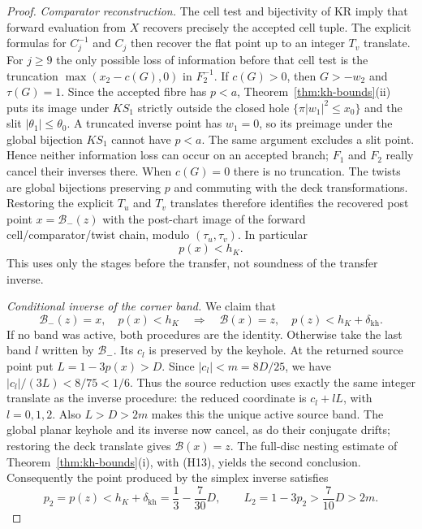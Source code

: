 \begin{proof}
\emph{Comparator reconstruction.} The cell test and bijectivity of $\mathrm{KR}$ imply that forward evaluation
from $X$ recovers precisely the accepted cell tuple. The explicit formulas for $C_j^{-1}$ and $C_j$ then recover
the flat point up to an integer $T_v$ translate. For $j\ge9$ the only possible loss of information before that
cell test is the truncation $\max(x_2-c(G),0)$ in $F_2^{-1}$. If $c(G)>0$, then $G>-w_2$ and $\tau(G)=1$.
Since the accepted fibre has $p<a$, Theorem~\ref{thm:kh-bounds}(ii) puts its image under $KS_1$ strictly outside
the closed hole $\{\pi|w_1|^2\le x_0\}$ and the slit $|\theta_1|\le\theta_0$.
A truncated inverse point has $w_1=0$, so its preimage under the global bijection $KS_1$ cannot have $p<a$.
The same argument excludes a slit point. Hence neither information loss can occur on an accepted branch;
$F_1$ and $F_2$ really cancel their inverses there. When $c(G)=0$ there is no truncation.
The twists are global bijections preserving $p$ and commuting with the deck transformations. Restoring the
explicit $T_u$ and $T_v$ translates therefore identifies the recovered post point $x=\mathcal B_-(z)$ with the
post-chart image of the forward cell/comparator/twist chain, modulo $(\tau_u,\tau_v)$. In particular
\begin{equation}\label{eq:inverse-source-post}
 p(x)<h_K.
\end{equation}
This uses only the stages before the transfer, not soundness of the transfer inverse.

\emph{Conditional inverse of the corner band.} We claim that
\[
 \mathcal B_-(z)=x,\quad p(x)<h_K
 \quad\Longrightarrow\quad \mathcal B(x)=z,\quad p(z)<h_K+\delta_{\mathrm{kh}}.
\]
If no band was active, both procedures are the identity. Otherwise take the last band $l$ written by
$\mathcal B_-$. Its $c_l$ is preserved by the keyhole. At the returned source point put $L=1-3p(x)>D$.
Since $|c_l|<m=8D/25$, we have $|c_l|/(3L)<8/75<1/6$. Thus the source reduction uses exactly the same integer
translate as the inverse procedure: the reduced coordinate is $c_l+lL$, with $l=0,1,2$.
Also $L>D>2m$ makes this the unique active source band. The global planar keyhole and its inverse now cancel,
as do their conjugate drifts; restoring the deck translate gives $\mathcal B(x)=z$.
The full-disc nesting estimate of Theorem~\ref{thm:kh-bounds}(i), with (H13), yields the second conclusion.
Consequently the point produced by the simplex inverse satisfies
\begin{equation}\label{eq:inverse-post-bound}
 p_2=p(z)<h_K+\delta_{\mathrm{kh}}=\frac13-\frac7{30}D,
 \qquad L_2=1-3p_2>\frac7{10}D>2m.
\end{equation}


\end{proof}
